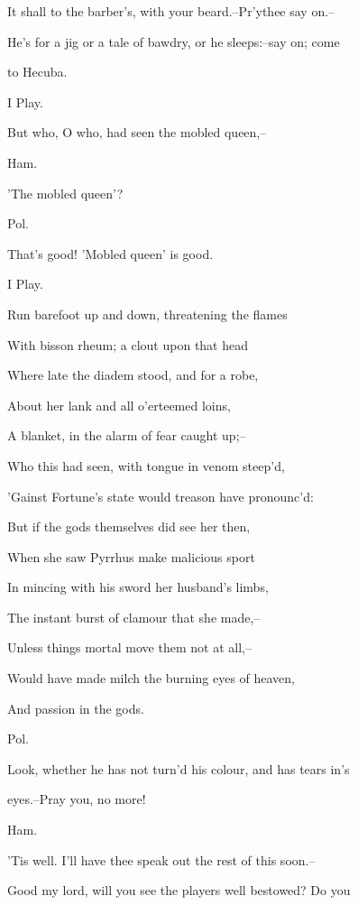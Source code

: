 \documentclass[12pt]{book}
\begin{document}
It shall to the barber's, with your beard.--Pr'ythee say on.--

He's for a jig or a tale of bawdry, or he sleeps:--say on; come

to Hecuba.



I Play.

   But who, O who, had seen the mobled queen,--



Ham.

'The mobled queen'?



Pol.

That's good! 'Mobled queen' is good.



I Play.

   Run barefoot up and down, threatening the flames

   With bisson rheum; a clout upon that head

   Where late the diadem stood, and for a robe,

   About her lank and all o'erteemed loins,

   A blanket, in the alarm of fear caught up;--

   Who this had seen, with tongue in venom steep'd,

   'Gainst Fortune's state would treason have pronounc'd:

   But if the gods themselves did see her then,

   When she saw Pyrrhus make malicious sport

   In mincing with his sword her husband's limbs,

   The instant burst of clamour that she made,--

   Unless things mortal move them not at all,--

   Would have made milch the burning eyes of heaven,

   And passion in the gods.



Pol.

Look, whether he has not turn'd his colour, and has tears in's

eyes.--Pray you, no more!



Ham.

'Tis well. I'll have thee speak out the rest of this soon.--

Good my lord, will you see the players well bestowed? Do you
\end{document}
